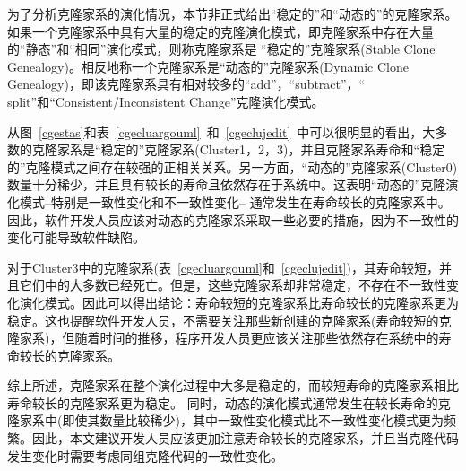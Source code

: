 为了分析克隆家系的演化情况，本节非正式给出“稳定的”和“动态的”的克隆家系。如果一个克隆家系中具有大量的稳定的克隆演化模式，即克隆家系中存在大量的“静态”和“相同”演化模式，则称克隆家系是 “稳定的”克隆家系(Stable Clone Genealogy)。相反地称一个克隆家系是“动态的”克隆家系(Dynamic Clone Genealogy)，即该克隆家系具有相对较多的“add”，“subtract”，“ split”和“Consistent/Inconsistent Change”克隆演化模式。

从图~\ref{cgestas}和表~\ref{cgecluargouml}~和~\ref{cgeclujedit}~中可以很明显的看出，大多数的克隆家系是“稳定的”克隆家系(Cluster1，2，3)，并且克隆家系寿命和“稳定的”克隆模式之间存在较强的正相关关系。另一方面，“动态的”克隆家系(Cluster0)数量十分稀少，并且具有较长的寿命且依然存在于系统中。这表明“动态的”克隆演化模式--特别是一致性变化和不一致性变化-- 通常发生在寿命较长的克隆家系中。因此，软件开发人员应该对动态的克隆家系采取一些必要的措施，因为不一致性的变化可能导致软件缺陷。

对于Cluster3中的克隆家系(表~\ref{cgecluargouml}和~\ref{cgeclujedit})，其寿命较短，并且它们中的大多数已经死亡。但是，这些克隆家系却非常稳定，不存在不一致性变化演化模式。因此可以得出结论：寿命较短的克隆家系比寿命较长的克隆家系更为稳定。这也提醒软件开发人员，不需要关注那些新创建的克隆家系(寿命较短的克隆家系)，但随着时间的推移，程序开发人员更应该关注那些依然存在系统中的寿命较长的克隆家系。

综上所述，克隆家系在整个演化过程中大多是稳定的，而较短寿命的克隆家系相比寿命较长的克隆家系更为稳定。 同时，动态的演化模式通常发生在较长寿命的克隆家系中(即使其数量比较稀少)，其中一致性变化模式比不一致性变化模式更为频繁。因此，本文建议开发人员应该更加注意寿命较长的克隆家系，并且当克隆代码发生变化时需要考虑同组克隆代码的一致性变化。
 
